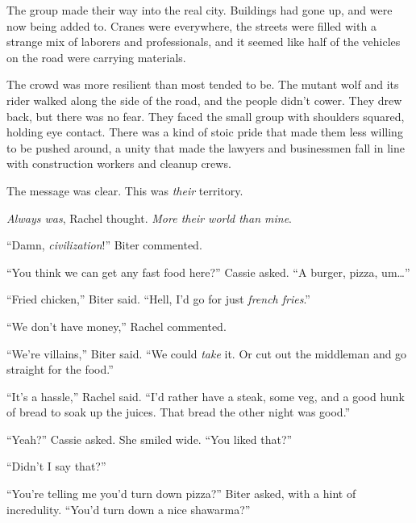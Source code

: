 





The group made their way into the real city.  Buildings had gone up, and were now being added to.  Cranes were everywhere, the streets were filled with a strange mix of laborers and professionals, and it seemed like half of the vehicles on the road were carrying materials.



The crowd was more resilient than most tended to be.  The mutant wolf and its rider walked along the side of the road, and the people didn't cower.  They drew back, but there was no fear.  They faced the small group with shoulders squared, holding eye contact.  There was a kind of stoic pride that made them less willing to be pushed around, a unity that made the lawyers and businessmen fall in line with construction workers and cleanup crews.



The message was clear.  This was\emph{ their} territory.



\emph{Always was}, Rachel thought.  \emph{More their world than mine}.



``Damn,\emph{ civilization}!''  Biter commented.



``You think we can get any fast food here?''  Cassie asked.  ``A burger, pizza, um\ldots''



``Fried chicken,'' Biter said.  ``Hell, I'd go for just \emph{french fries}.''



``We don't have money,'' Rachel commented.



``We're villains,'' Biter said.  ``We could \emph{take} it.  Or cut out the middleman and go straight for the food.''



``It's a hassle,'' Rachel said.  ``I'd rather have a steak, some veg, and a good hunk of bread to soak up the juices.  That bread the other night was good.''



``Yeah?''  Cassie asked.  She smiled wide.  ``You liked that?''



``Didn't I say that?''



``You're telling me you'd turn down pizza?''  Biter asked, with a hint of incredulity.  ``You'd turn down a nice shawarma?''




